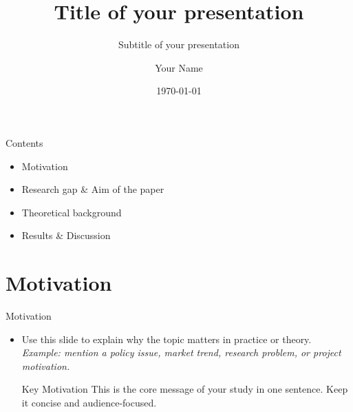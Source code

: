 \documentclass[t]{beamer}
\title[Title]{Title of your presentation}
\subtitle{Subtitle of your presentation}
\author{Your Name}
\institute[BDIC]{Beijing-Dublin International College}
\date{\today}
\begin{document}
\begin{frame}
    \FirstLastPageLayout
    \titlepage
\end{frame}

\begin{frame}{Contents}
    \begin{itemize}
        \item Motivation
        \item Research gap \& Aim of the paper
        \item Theoretical background
        \item Results \& Discussion
    \end{itemize}
\end{frame}

\section{Motivation}
\begin{frame}{Motivation}
    \begin{itemize}
        \item Use this slide to explain why the topic matters in practice or theory.
        \vspace{0.2cm}
        \footnotesize{\textit{Example: mention a policy issue, market trend, research problem, or project motivation.}}
        \vspace{0.2cm}
        \normalsize

        \begin{block}{Key Motivation}
            This is the core message of your study in one sentence. Keep it concise and audience-focused.
        \end{block}

    \end{itemize}
\end{frame}
\end{document}
